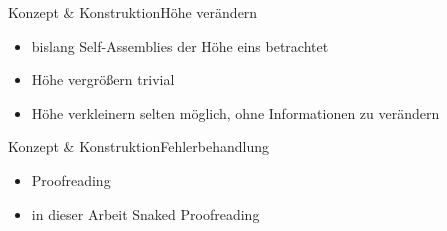\documentclass{beamer}
\begin{document}
\begin{frame}[t]{Konzept \& Konstruktion}{Höhe verändern}
    \begin{itemize}
        \item bislang Self-Assemblies der Höhe eins betrachtet
        \item Höhe vergrößern trivial
        \item Höhe verkleinern selten möglich, ohne Informationen zu verändern
    \end{itemize}
    \begin{figure}
        \centering 
    \end{figure}
\end{frame}

\begin{frame}[t]{Konzept \& Konstruktion}{Fehlerbehandlung}
    \begin{itemize}
        \item Proofreading
        \item in dieser Arbeit Snaked Proofreading
    \end{itemize}
    \vspace{0.5cm}
    \begin{figure}
        \centering
    \end{figure}
    
\end{frame}
\end{document}
